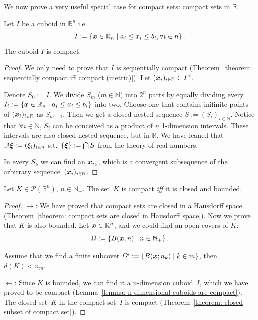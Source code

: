 \documentclass[openany]{book}
\begin{document}
We now prove a very useful special case for compact sets: compact sets in $\mathbb R$.

\begin{lemma}%
	\label{lemma: n-dimensional cuboids are compact}
	Let $I$ be a cuboid in $\mathbb R^n$ i.e.\ 
	\begin{equation*}
		I := \{\boldsymbol{x} \in \mathbb R_n \mid a_i \leq x_i \leq b_i, \forall i \in n\}\,.
	\end{equation*}
	The cuboid $I$ is compact.
\end{lemma}
\begin{proof}
	We only need to prove that $I$ is sequentially compact (Theorem~\ref{theorem: sequentially compact iff compact (metric)}). 
	Let $(\boldsymbol{x}_i)_{i \in \mathbb N} \in I^\mathbb N$. 
	
	Denote $S_0 := I$.
	We divide $S_m$ ($m \in \mathbb N$) into $2^n$ parts by equally dividing every $I_i := \{\boldsymbol{x} \in \mathbb R_n \mid a_i \leq x_i \leq b_i\}$ into two. 
	Choose one that contains inifinite points of $(\boldsymbol{x}_i)_{i \in \mathbb N}$ as $S_{m+1}$. 
	Then we get a closed nested sequence $S := (S_i)_{i \in \mathbb N}$.
	Notice that $\forall i \in \mathbb N$, $S_i$ can be conceived as a product of $n$ 1-dimension intervals. These intervals are also closed nested sequence, but in $\mathbb R$. 
	We have leaned that $\exists! \boldsymbol{\xi} := (\xi_i)_{i \in n}$ s.t.\ $\{\boldsymbol{\xi}\} := \bigcap S$ from the theory of real numbers.

	In every $S_k$ we can find an $\boldsymbol{x}_{i_k}$, which is a convergent subsequence of the arbitrary sequence~$(\boldsymbol{x}_i)_{i \in \mathbb N}$.
\end{proof}

\begin{theorem}%
	\label{theorem: compact iff closed and bounded in Rn}
	Let $K \in \mathscr P(\mathbb R^n)$, $n \in \mathbb N_+$.
	The set~$K$ is compact \emph{iff} it is closed and bounded.
\end{theorem}
\begin{proof}
	$\to$: 
	We have proved that compact sets are closed in a Hausdorff space (Theorem~\ref{theorem: compact sets are closed in Hausdorff space}). 
	Now we prove that $K$ is also bounded. 
	Let $\boldsymbol{x} \in \mathbb R^n$, and we could find an open covers of $K$: 
	\begin{equation*}
		\varOmega := \{B(\boldsymbol{x}; n) \mid n \in \mathbb N_+\}\,.
	\end{equation*}

	Assume that we find a finite subcover $\varOmega' := \{B(\boldsymbol{x}; n_k) \mid k \in m\}$, then $d(K) < n_m$.

	$\gets$: Since $K$ is bounded, we can find it a $n$-dimension cuboid~$I$, which we have proved to be compact (Lemma~\ref{lemma: n-dimensional cuboids are compact}). 
	The closed set~$K$ in the compact set~$I$ is compact (Theorem~\ref{theorem: closed subset of compact set}).

\end{proof}
\end{document}
